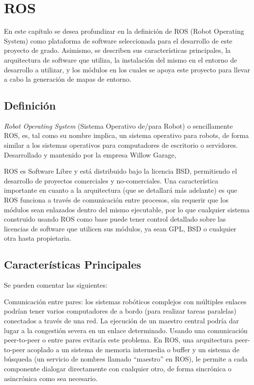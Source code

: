 \chapter{ROS}

En este capítulo se desea profundizar en la definición de ROS (Robot Operating System) como plataforma de software seleccionada para el desarrollo de este proyecto de grado. Asimismo, se describen sus características principales, la arquitectura de software que utiliza, la instalación del mismo en el entorno de desarrollo a utilizar, y los módulos en los cuales se apoya este proyecto para llevar a cabo la generación de mapas de entorno.

\section{Definición}

\textit{Robot Operating System} (Sistema Operativo de/para Robot) o sencillamente ROS, es, tal como su nombre implica, un sistema operativo para robots, de forma similar a los sistemas operativos para computadores de escritorio o servidores. Desarrollado y mantenido por la empresa Willow Garage, 

ROS es Software Libre y está distribuido bajo la licencia BSD, permitiendo el desarrollo de proyectos comerciales y no-comerciales. Una característica importante en cuanto a la arquitectura (que se detallará más adelante) es que ROS funciona a través de comunicación entre procesos, sin requerir que los módulos sean enlazados dentro del mismo ejecutable, por lo que cualquier sistema construido usando ROS como base puede tener control detallado sobre las licencias de software que utilicen sus módulos, ya sean GPL, BSD o cualquier otra hasta propietaria. \cite{quigley2009ros}

\section{Características Principales}

Se pueden comentar las siguientes:

Comunicación entre pares: los sistemas robóticos complejos con múltiples enlaces podrían tener varios computadores de a bordo (para realizar tareas paralelas) conectados a través de una red. La ejecución de un maestro central podría dar lugar a la congestión severa en un enlace determinado. Usando una comunicación peer-to-peer o entre pares evitaría este problema. En ROS, una arquitectura peer-to-peer acoplado a un sistema de memoria intermedia o buffer y un sistema de búsqueda (un servicio de nombres llamado ``maestro'' en ROS), le permite a cada componente dialogar directamente con cualquier otro, de forma sincrónica o asincrónica como sea necesario.

